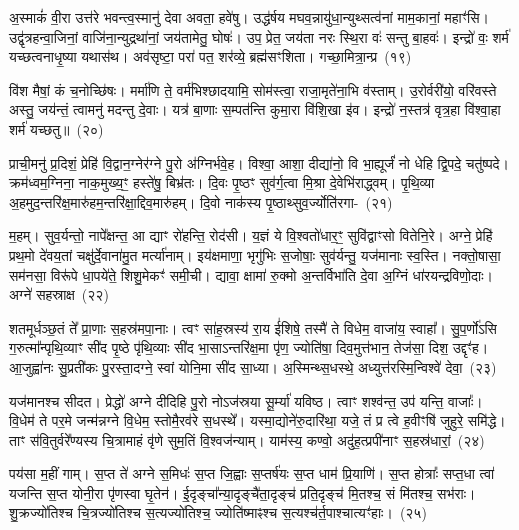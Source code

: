 अ॒स्माकं॑ वी॒रा उत्त॑रे भवन्त्व॒स्मानु॑ देवा अवता॒ हवे॑षु। उद्ध॑र्\mbox{}षय मघव॒न्नायु॑धा॒न्युथ्सत्व॑नां माम॒कानां॒ महाꣳ॑सि। उद्वृ॑त्रहन्वा॒जिनां॒ वाजि॑ना॒न्युद्रथा॑नां॒ जय॑तामेतु॒ घोषः॑। उप॒ प्रेत॒ जय॑ता नरः स्थि॒रा वः॑ सन्तु बा॒हवः॑। इन्द्रो॑ वः॒ शर्म॑ यच्छत्वनाधृ॒ष्या यथास॑थ। अव॑सृष्टा॒ परा॑ पत॒ शर॑व्ये॒ ब्रह्म॑सꣳशिता। गच्छा॒मित्रा॒न्प्र~(१९)\ip

वि॑श मैषां॒ कं च॒नोच्छि॑षः। मर्मा॑णि ते॒ वर्म॑भिश्छादयामि॒ सोम॑स्त्वा॒ राजा॒मृते॑ना॒भि व॑स्ताम्। उ॒रोर्वरी॑यो॒ वरि॑वस्ते अस्तु॒ जय॑न्तं॒ त्वामनु॑ मदन्तु दे॒वाः। यत्र॑ बा॒णाः स॒म्पत॑न्ति कुमा॒रा वि॑शि॒खा इ॑व। इन्द्रो॑ न॒स्तत्र॑ वृत्र॒हा वि॑श्वा॒हा शर्म॑ यच्छतु॥~(२०)\ip

{\anuvakamend[{दी॒या॒ दा॒यो ज॑यन्त्व॒मित्रा॒न्प्र च॑त्वारि॒ꣳ॒शच्च॑}]}

प्राची॒मनु॑ प्र॒दिशं॒ प्रेहि॑ वि॒द्वान॒ग्नेर॑ग्ने पु॒रो अ॑ग्निर्भवे॒ह। विश्वा॒ आशा॒ दीद्या॑नो॒ वि भा॒ह्यूर्जं॑ नो धेहि द्वि॒पदे॒ चतु॑ष्पदे। क्रम॑ध्वम॒ग्निना॒ नाक॒मुख्य॒ꣳ॒ हस्ते॑षु॒ बिभ्र॑तः। दि॒वः पृ॒ष्ठꣳ सुव॑र्ग॒त्वा मि॒श्रा दे॒वेभि॑राद्ध्वम्। पृ॒थि॒व्या अ॒हमुद॒न्तरि॑क्ष॒मारु॑हम॒न्तरि॑क्षा॒द्दिव॒मारु॑हम्। दि॒वो नाक॑स्य पृ॒ष्ठाथ्सुव॒र्ज्योति॑रगा-~(२१)\ip

म॒हम्। सुव॒र्यन्तो॒ नापे᳚क्षन्त॒ आ द्याꣳ रो॑हन्ति॒ रोद॑सी। य॒ज्ञं ये वि॒श्वतो॑धार॒ꣳ॒ सुवि॑द्वाꣳसो वितेनि॒रे। अग्ने॒ प्रेहि॑ प्रथ॒मो दे॑वय॒तां चक्षु॑र्दे॒वाना॑\-मु॒त मर्त्या॑नाम्। इय॑क्षमाणा॒ भृगु॑भिः स॒जोषाः॒ सुव॑र्यन्तु॒ यज॑मानाः स्व॒स्ति। नक्तो॒षासा॒ सम॑नसा॒ विरू॑पे धा॒पये॑ते॒ शिशु॒मेकꣳ॑ समी॒ची। द्यावा॒ क्षामा॑ रु॒क्मो अ॒न्तर्विभा॑ति दे॒वा अ॒ग्निं धा॑रयन्द्रविणो॒दाः। अग्ने॑ सहस्राक्ष~(२२)\ip

शतमूर्धञ्छ॒तं ते᳚ प्रा॒णाः स॒हस्र॑मपा॒नाः। त्वꣳ सा॑ह॒स्रस्य॑ रा॒य ई॑शिषे॒ तस्मै॑ ते विधेम॒ वाजा॑य॒ स्वाहा᳚। सु॒प॒र्णो॑\-ऽसि ग॒रुत्मा᳚न्पृथि॒व्याꣳ सी॑द पृ॒ष्ठे पृ॑थि॒व्याः सी॑द भा॒सा\-ऽ\-न्तरि॑क्ष॒मा पृ॑ण॒ ज्योति॑षा॒ दिव॒मुत्त॑भान॒ तेज॑सा॒ दिश॒ उद्दृꣳ॑ह। आ॒जुह्वा॑नः सु॒प्रती॑कः पु॒रस्ता॒दग्ने॒ स्वां योनि॒मा सी॑द सा॒ध्या। अ॒स्मिन्थ्स॒धस्थे॒ अध्युत्त॑रस्मि॒न्विश्वे॑ देवा॒~(२३)\ip

यज॑मानश्च सीदत। प्रेद्धो॑ अग्ने दीदिहि पु॒रो नो\-ऽज॑स्रया सू॒र्म्या॑ यविष्ठ। त्वाꣳ शश्व॑न्त॒ उप॑ यन्ति॒ वाजाः᳚। वि॒धेम॑ ते पर॒मे जन्म॑न्नग्ने वि॒धेम॒ स्तोमै॒रव॑रे स॒धस्थे᳚। यस्मा॒द्योने॑रु॒दारि॑था॒ यजे॒ तं प्र त्वे ह॒वीꣳषि॑ जुहुरे॒ समि॑द्धे। ताꣳ स॑वि॒तुर्वरे᳚ण्यस्य चि॒त्रामाहं वृ॑णे सुम॒तिं वि॒श्वज॑न्याम्। याम॑स्य॒ कण्वो॒ अदु॑ह॒त्प्रपी॑नाꣳ स॒हस्र॑धारां॒~(२४)\ip

पय॑सा म॒हीं गाम्। स॒प्त ते॑ अग्ने स॒मिधः॑ स॒प्त जि॒ह्वाः स॒प्तर्\mbox{}ष॑यः स॒प्त धाम॑ प्रि॒याणि॑। स॒प्त होत्राः᳚ सप्त॒धा त्वा॑ यजन्ति स॒प्त योनी॒रा पृ॑णस्वा घृ॒तेन॑। ई॒दृङ्चा᳚न्या॒दृङ्चै॑ता॒दृङ्च॑ प्रति॒दृङ्च॑ मि॒तश्च॒ सं मि॑तश्च॒ सभ॑राः। शु॒क्रज्यो॑तिश्च चि॒त्रज्यो॑तिश्च स॒त्यज्यो॑तिश्च॒ ज्योति॑ष्माꣴश्च स॒त्यश्च॑र्त॒पाश्चात्यꣳ॑हाः।~(२५)\ip

